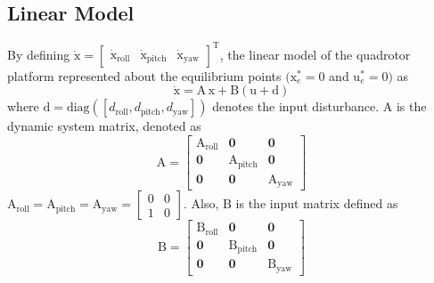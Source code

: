 \documentclass[3p]{elsarticle}
\begin{document}
\subsection{Linear Model}

\noindent By defining $\boldsymbol{\dot{\mathrm{x}}} = \begin{bmatrix}
    \boldsymbol{{\mathrm{\dot x_{\text{roll}}}}}&
    \boldsymbol{{\mathrm{\dot x_{\text{pitch}}}}}&
    \boldsymbol{{\mathrm{\dot x_{\text{yaw}}}}}
\end{bmatrix}^{\mathrm{T}}$, the linear model of the quadrotor platform represented about the equilibrium points $(\boldsymbol{{\mathrm{x}}}_e^*\!=\!0$ and $\boldsymbol{{\mathrm{u}}}_e^*\!=\!0)$ as
\begin{equation}\label{eq:linear}
    \boldsymbol{\dot{\mathrm{x}}} = \boldsymbol{\mathrm{A\,x}} + 
    \boldsymbol{\mathrm{B}}
    \left(\boldsymbol{\mathrm{u}} + \boldsymbol{\mathrm{d}}\right)
\end{equation}
where $\boldsymbol{\mathrm{d}} = \text{diag}([d_{\text{roll}}, d_{\text{pitch}}, d_{\text{yaw}}])$ denotes the input disturbance.
$\boldsymbol{\mathrm{A}}$ is the dynamic system matrix, denoted as
\begin{equation}
    \boldsymbol{\mathrm{A}} = \begin{bmatrix}
        \boldsymbol{{\mathrm{A_{\text{roll}}}}} & \boldsymbol{0} & \boldsymbol{0}\\
        \boldsymbol{0} & \boldsymbol{{\mathrm{A_{\text{pitch}}}}} & \boldsymbol{0} \\
        \boldsymbol{0} & \boldsymbol{0} & \boldsymbol{{\mathrm{A_{\text{yaw}}}}}
    \end{bmatrix}
\end{equation}
$
        \boldsymbol{\mathrm{A}}_{\text{roll}}  =\boldsymbol{\mathrm{A}}_{\text{pitch}}  = \boldsymbol{\mathrm{A}}_{\text{yaw}}  = \begin{bmatrix}
            0 & 0\\
            1 & 0
        \end{bmatrix}
$. Also, $\boldsymbol{\mathrm{B}}$ is the input matrix defined as
\begin{equation}
    \boldsymbol{\mathrm{B}} =
    \begin{bmatrix}
        \boldsymbol{{\mathrm{B_{\text{roll}}}}} & \boldsymbol{0} & \boldsymbol{0}\\
        \boldsymbol{0} & \boldsymbol{{\mathrm{B_{\text{pitch}}}}} & \boldsymbol{0} \\
        \boldsymbol{0} & \boldsymbol{0} & \boldsymbol{{\mathrm{B_{\text{yaw}}}}}
    \end{bmatrix}
\end{equation}
\end{document}

